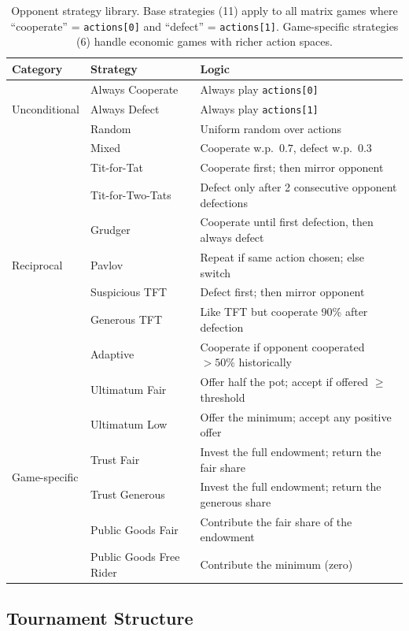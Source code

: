 \begin{table}[h]
\centering\small
\caption{Opponent strategy library. Base strategies (11) apply to all
matrix games where ``cooperate'' = \texttt{actions[0]} and ``defect'' =
\texttt{actions[1]}. Game-specific strategies (6) handle economic games
with richer action spaces.}
\label{tab:strategies}
\begin{tabular}{@{}llp{5.8cm}@{}}
\toprule
\textbf{Category} & \textbf{Strategy} & \textbf{Logic} \\
\midrule
\multirow{3}{*}{Unconditional}
& Always Cooperate & Always play \texttt{actions[0]} \\
& Always Defect & Always play \texttt{actions[1]} \\
& Random & Uniform random over actions \\
& Mixed & Cooperate w.p.\ $0.7$, defect w.p.\ $0.3$ \\
\midrule
\multirow{7}{*}{Reciprocal}
& Tit-for-Tat & Cooperate first; then mirror opponent \\
& Tit-for-Two-Tats & Defect only after 2 consecutive opponent defections \\
& Grudger & Cooperate until first defection, then always defect \\
& Pavlov & Repeat if same action chosen; else switch \\
& Suspicious TFT & Defect first; then mirror opponent \\
& Generous TFT & Like TFT but cooperate 90\% after defection \\
& Adaptive & Cooperate if opponent cooperated $>50\%$ historically \\
\midrule
\multirow{6}{*}{Game-specific}
& Ultimatum Fair & Offer half the pot; accept if offered $\ge$ threshold \\
& Ultimatum Low & Offer the minimum; accept any positive offer \\
& Trust Fair & Invest the full endowment; return the fair share \\
& Trust Generous & Invest the full endowment; return the generous share \\
& Public Goods Fair & Contribute the fair share of the endowment \\
& Public Goods Free Rider & Contribute the minimum (zero) \\
\bottomrule
\end{tabular}
\end{table}

\subsection{Tournament Structure}
\label{sec:tournament-structure}

